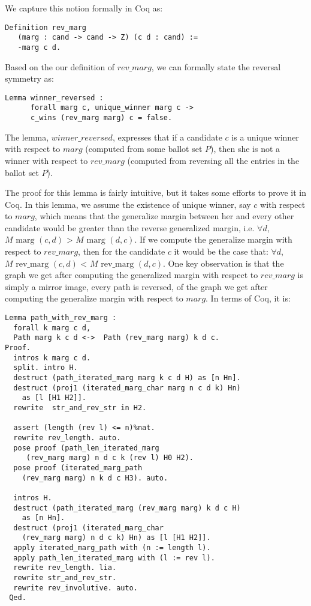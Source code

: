 We capture this notion formally in Coq as:

\begin{verbatim}
Definition rev_marg 
   (marg : cand -> cand -> Z) (c d : cand) :=
   -marg c d.
\end{verbatim}

Based on the our definition of $rev\_marg$, we can formally state the reversal symmetry as:
\begin{verbatim}
Lemma winner_reversed :
      forall marg c, unique_winner marg c ->
      c_wins (rev_marg marg) c = false.
\end{verbatim}

The lemma, $winner\_reversed$, expresses that if a candidate $c$ is a unique winner 
with respect to $marg$ (computed from some ballot set $P$), then she is not a winner with respect 
to $rev\_marg$ (computed from reversing all the entries in the ballot set $P$).


The proof for this lemma is fairly intuitive, but it takes some efforts to prove it in Coq. 
In this lemma, we assume the 
existence of unique winner, say $c$ with respect to $marg$, which means that the generalize 
margin between her and every other candidate would be greater than the reverse generalized 
margin, i.e.  $\forall d$, $M \text{ marg } (c, d)$ > $M \text{ marg } (d, c)$. 
If we compute the generalize margin with respect to $rev\_marg$, then 
for the candidate $c$ it would be the case that:  
$\forall d$, $M \text{ rev\_marg } (c, d)$ <  $M \text{ rev\_marg } (d, c)$. 
One key observation is that the graph we get after computing the generalized margin with respect to $rev\_marg$ is 
simply a mirror image, every path is reversed, of the graph we get after computing the generalize margin with respect to $marg$. 
In terms of Coq, it is:
\begin{verbatim}
Lemma path_with_rev_marg :
  forall k marg c d,
  Path marg k c d <->  Path (rev_marg marg) k d c.
Proof.
  intros k marg c d.
  split. intro H. 
  destruct (path_iterated_marg marg k c d H) as [n Hn].
  destruct (proj1 (iterated_marg_char marg n c d k) Hn) 
    as [l [H1 H2]].
  rewrite  str_and_rev_str in H2.

  assert (length (rev l) <= n)%nat.
  rewrite rev_length. auto.
  pose proof (path_len_iterated_marg 
     (rev_marg marg) n d c k (rev l) H0 H2).
  pose proof (iterated_marg_path 
    (rev_marg marg) n k d c H3). auto. 
      
  intros H. 
  destruct (path_iterated_marg (rev_marg marg) k d c H) 
    as [n Hn].  
  destruct (proj1 (iterated_marg_char 
    (rev_marg marg) n d c k) Hn) as [l [H1 H2]].
  apply iterated_marg_path with (n := length l).
  apply path_len_iterated_marg with (l := rev l).
  rewrite rev_length. lia. 
  rewrite str_and_rev_str.
  rewrite rev_involutive. auto.
 Qed.
    
\end{verbatim}


